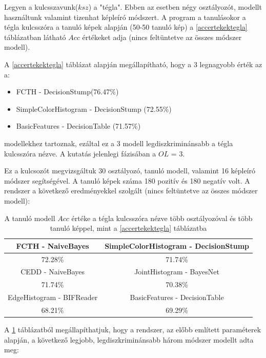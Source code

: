 \documentclass[12pt, a4paper, oneside]{book}
\theoremstyle{tetel}
\begin{document}
	Legyen a kulcsszavunk($ksz$) a "tégla". Ebben az esetben négy osztályozót, modellt használtunk valamint tizenhat képleíró módszert. A program a tanulásokor a tégla kulcsszóra a tanuló képek alapján (50-50 tanuló kép) a \ref{accertekektegla} táblázatban látható $Acc$ értékeket adja (nincs feltüntetve az összes módszer modell).

	A \ref{accertekektegla} táblázat alapján megállapítható, hogy a 3 legnagyobb érték az a:

\begin{itemize}
  \item FCTH - DecisionStump(76.47\%)
  \item SimpleColorHistogram - DecisionStump (72.55\%)
  \item BasicFeatures - DecisionTable (71.57\%)
\end{itemize}

	modellekhez tartoznak, ezáltal ez a 3 modell legdiszkriminánsabb a tégla kulcsszóra nézve. A kutatás jelenlegi fázisában a $OL$ = 3.

	Ez a kulcsozót megvizsgáltuk 30 osztályozó, tanuló modell, valamint 16 képleíró módszer segítségével. A tanuló képek száma 180 pozitív és 180 negatív volt. A rendszer a következő eredményekkel szolgált (nincs feltüntetve az összes módszer modell):

\begin{table}[h]
\begin{center}
\begin{tabular}{|c|c|}
\hline 
FCTH - NaiveBayes & SimpleColorHistogram - DecisionStump  \\ 
\hline 
72.28\% & 71.74\%   \\ 
\hline 
CEDD - NaiveBayes & JointHistogram - BayesNet \\
\hline 
71.74\% & 70.38\%  \\
\hline
EdgeHistogram - BIFReader & BasicFeatures - DecisionTable \\ 
\hline
68.21\%& 69.29\% \\
\hline
\end{tabular} 
\caption{{ A tanuló modell $Acc$ értéke a tégla kulcsszóra nézve több osztályozóval és több tanuló képpel, mint a \ref{accertekektegla} táblázatba}}
\label{accertekektegla2}
\end{center}
\end{table}

	A \ref{accertekektegla2} táblázatból megállapíthatjuk, hogy a rendszer, az előbb említett paraméterek alapján, a következő legjobb, legdiszkriminánsabb három módszer modellt adta meg:
\end{document}

